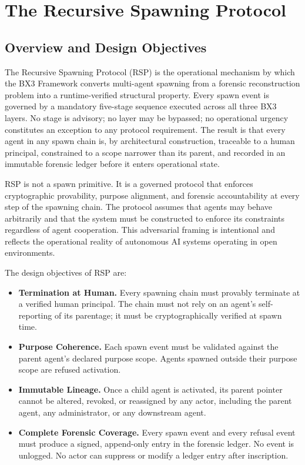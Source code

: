 \section{The Recursive Spawning Protocol}

\subsection{Overview and Design Objectives}

The Recursive Spawning Protocol (RSP) is the operational mechanism by which the BX3 Framework converts multi-agent spawning from a forensic reconstruction problem into a runtime-verified structural property. Every spawn event is governed by a mandatory five-stage sequence executed across all three BX3 layers. No stage is advisory; no layer may be bypassed; no operational urgency constitutes an exception to any protocol requirement. The result is that every agent in any spawn chain is, by architectural construction, traceable to a human principal, constrained to a scope narrower than its parent, and recorded in an immutable forensic ledger before it enters operational state.

RSP is not a spawn primitive. It is a governed protocol that enforces cryptographic provability, purpose alignment, and forensic accountability at every step of the spawning chain. The protocol assumes that agents may behave arbitrarily and that the system must be constructed to enforce its constraints regardless of agent cooperation. This adversarial framing is intentional and reflects the operational reality of autonomous AI systems operating in open environments.

The design objectives of RSP are:

\begin{itemize}
    \item \textbf{Termination at Human.} Every spawning chain must provably terminate at a verified human principal. The chain must not rely on an agent's self-reporting of its parentage; it must be cryptographically verified at spawn time.
    \item \textbf{Purpose Coherence.} Each spawn event must be validated against the parent agent's declared purpose scope. Agents spawned outside their purpose scope are refused activation.
    \item \textbf{Immutable Lineage.} Once a child agent is activated, its parent pointer cannot be altered, revoked, or reassigned by any actor, including the parent agent, any administrator, or any downstream agent.
    \item \textbf{Complete Forensic Coverage.} Every spawn event and every refusal event must produce a signed, append-only entry in the forensic ledger. No event is unlogged. No actor can suppress or modify a ledger entry after inscription.
\end{itemize}

